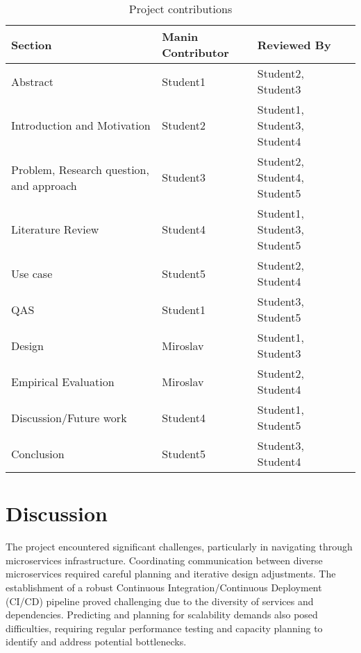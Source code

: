 \documentclass[conference, onecolumn]{IEEEtran}
\begin{document}
\begin{table}[H]
    \centering
    \begin{tabular}{|l|l|l|}
    \toprule
                                     Section & Manin Contributor &           Reviewed By \\
    \midrule
                                    Abstract &   Student1 &           Student2, Student3 \\
                 Introduction and Motivation &   Student2 & Student1, Student3, Student4 \\
    Problem, Research question, and approach &   Student3 & Student2, Student4, Student5 \\
                           Literature Review &   Student4 & Student1, Student3, Student5 \\
                                    Use case &   Student5 &           Student2, Student4 \\
                                         QAS &   Student1 &           Student3, Student5 \\
                                      Design &   Miroslav &           Student1, Student3 \\
                        Empirical Evaluation &   Miroslav &           Student2, Student4 \\
                      Discussion/Future work &   Student4 &           Student1, Student5 \\
                                  Conclusion &   Student5 &           Student3, Student4 \\
    \bottomrule
    \end{tabular}
    \caption{Project contributions}
    \label{tab:project_contributions}
\end{table}

\section{Discussion}

The project encountered significant challenges, particularly in navigating through microservices infrastructure. Coordinating communication between diverse microservices required careful planning and iterative design adjustments. The establishment of a robust Continuous Integration/Continuous Deployment (CI/CD) pipeline proved challenging due to the diversity of services and dependencies. Predicting and planning for scalability demands also posed difficulties, requiring regular performance testing and capacity planning to identify and address potential bottlenecks.
\end{document}
